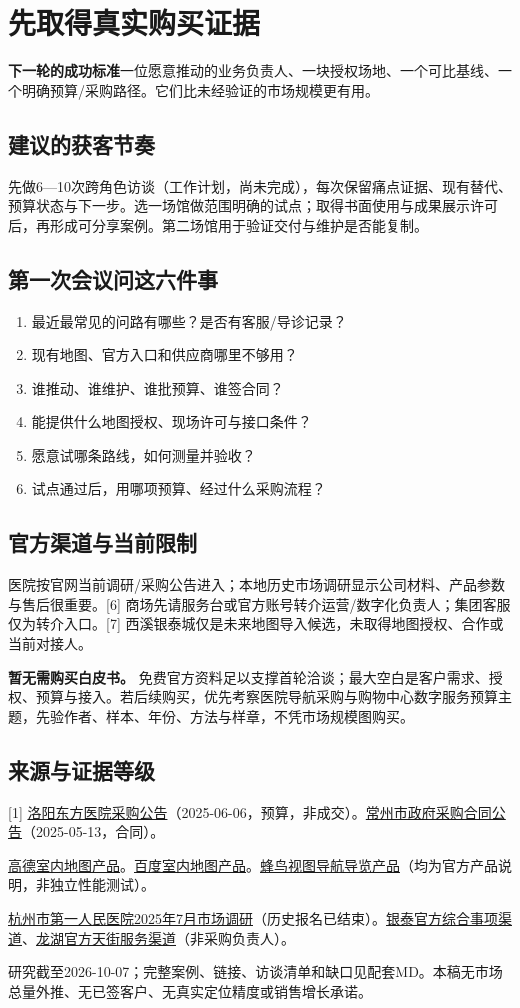 \documentclass[UTF8,11pt,fontset=fandol]{ctexart}
\newcommand{\lead}[1]{\colorbox{pale}{\parbox{\dimexpr\linewidth-16pt\relax}{\vspace{6pt}#1\vspace{6pt}}}\par}
\newcommand{\page}[2]{\clearpage{\small\bfseries\color{brand}#1}\section*{#2}}
\begin{document}
\page{04\quad 从演示到合作}{先取得真实购买证据}
\lead{\textbf{下一轮的成功标准}\quad 一位愿意推动的业务负责人、一块授权场地、一个可比基线、一个明确预算/采购路径。它们比未经验证的市场规模更有用。}
\subsection*{建议的获客节奏}
先做6—10次跨角色访谈（工作计划，尚未完成），每次保留痛点证据、现有替代、预算状态与下一步。选一场馆做范围明确的试点；取得书面使用与成果展示许可后，再形成可分享案例。第二场馆用于验证交付与维护是否能复制。
\subsection*{第一次会议问这六件事}
\begin{enumerate}
\item 最近最常见的问路有哪些？是否有客服/导诊记录？
\item 现有地图、官方入口和供应商哪里不够用？
\item 谁推动、谁维护、谁批预算、谁签合同？
\item 能提供什么地图授权、现场许可与接口条件？
\item 愿意试哪条路线，如何测量并验收？
\item 试点通过后，用哪项预算、经过什么采购流程？
\end{enumerate}
\subsection*{官方渠道与当前限制}
医院按官网当前调研/采购公告进入；本地历史市场调研显示公司材料、产品参数与售后很重要。[6] 商场先请服务台或官方账号转介运营/数字化负责人；集团客服仅为转介入口。[7] 西溪银泰城仅是未来地图导入候选，未取得地图授权、合作或当前对接人。

\textbf{暂无需购买白皮书。} 免费官方资料足以支撑首轮洽谈；最大空白是客户需求、授权、预算与接入。若后续购买，优先考察医院导航采购与购物中心数字服务预算主题，先验作者、样本、年份、方法与样章，不凭市场规模图购买。
\subsection*{来源与证据等级}
{\footnotesize
[1] \href{https://www.lydfyy.com/doc/11/2506/9433.html}{洛阳东方医院采购公告}（2025-06-06，预算，非成交）。\quad
[2] \href{https://zfcg.changzhou.gov.cn/html/ns/zfjzcg_htgg/581399523463842.html}{常州市政府采购合同公告}（2025-05-13，合同）。\par
[3] \href{https://lbs.amap.com/product/indoorintro}{高德室内地图产品}。\quad
[4] \href{https://lbs.baidu.com/products/indoor}{百度室内地图产品}。\quad
[5] \href{https://www.fengmap.com/navigation/}{蜂鸟视图导航导览产品}（均为官方产品说明，非独立性能测试）。\par
[6] \href{https://www.hz-hospital.com/upload_public/20250711/202507110857549453.pdf}{杭州市第一人民医院2025年7月市场调研}（历史报名已结束）。\quad
[7] \href{https://www.china-yintai.com/zh-CN/news/media}{银泰官方综合事项渠道}、\href{https://www.longfor.com/customer/contact.html}{龙湖官方天街服务渠道}（非采购负责人）。\par
研究截至2026-10-07；完整案例、链接、访谈清单和缺口见配套MD。本稿无市场总量外推、无已签客户、无真实定位精度或销售增长承诺。
}
\end{document}
